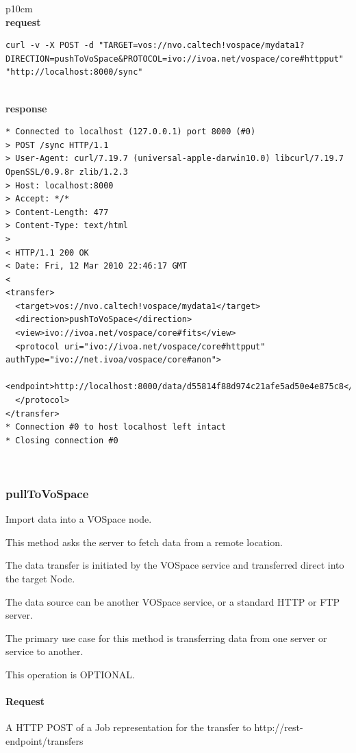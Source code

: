 \documentclass[11pt,a4paper]{ivoa}
\begin{document}
\begin{tabular}{ p{10cm} }
\\
\textbf{request} \\
\begin{lstlisting}
curl -v -X POST -d "TARGET=vos://nvo.caltech!vospace/mydata1?DIRECTION=pushToVoSpace&PROTOCOL=ivo://ivoa.net/vospace/core#httpput" "http://localhost:8000/sync"
\end{lstlisting} \\
\textbf{response} \\
\begin{lstlisting}
* Connected to localhost (127.0.0.1) port 8000 (#0)
> POST /sync HTTP/1.1
> User-Agent: curl/7.19.7 (universal-apple-darwin10.0) libcurl/7.19.7 OpenSSL/0.9.8r zlib/1.2.3
> Host: localhost:8000
> Accept: */*
> Content-Length: 477
> Content-Type: text/html
> 
< HTTP/1.1 200 OK
< Date: Fri, 12 Mar 2010 22:46:17 GMT
< 
<transfer>
  <target>vos://nvo.caltech!vospace/mydata1</target>
  <direction>pushToVoSpace</direction>
  <view>ivo://ivoa.net/vospace/core#fits</view>
  <protocol uri="ivo://ivoa.net/vospace/core#httpput" authType="ivo://net.ivoa/vospace/core#anon">
    <endpoint>http://localhost:8000/data/d55814f88d974c21afe5ad50e4e875c8</endpoint>
  </protocol>
</transfer>
* Connection #0 to host localhost left intact
* Closing connection #0
\end{lstlisting} \\
\end{tabular}

\subsubsection{pullToVoSpace}
Import data into a VOSpace node.

This method asks the server to fetch data from a remote location.

The data transfer is initiated by the VOSpace service and transferred direct into the target Node.

The data source can be another VOSpace service, or a standard HTTP or FTP server.

The primary use case for this method is transferring data from one server or service to another.

This operation is OPTIONAL.

\paragraph{Request}
A HTTP POST of a Job representation for the transfer to http://rest-endpoint/transfers
\end{document}
